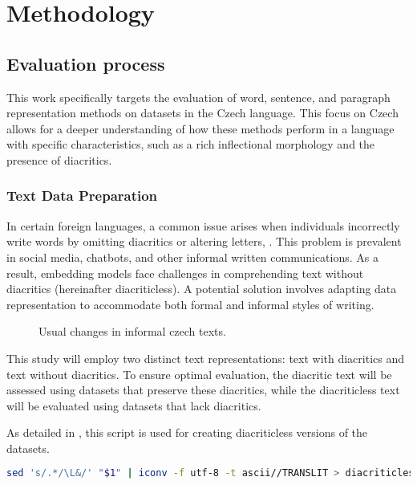 
\chapter{Methodology\label{chap:methodology}}

\section{Evaluation process}

This work specifically targets the evaluation of word, sentence, and paragraph representation methods on datasets in the Czech language.
This focus on Czech allows for a deeper understanding of how these methods perform in a language with specific characteristics, such as a rich inflectional morphology and the presence of diacritics.

\subsection{Text Data Preparation}
In certain foreign languages, a common issue arises when individuals incorrectly write words by omitting diacritics or altering letters, .
This problem is prevalent in social media, chatbots, and other informal written communications.
As a result, embedding models face challenges in comprehending text without diacritics (hereinafter diacriticless).
A potential solution involves adapting data representation to accommodate both formal and informal styles of writing.

\begin{figure}[h]
  \centering
  
  \caption{Usual changes in informal czech texts.}
  \label{fig:diacritics_diacriticless}
\end{figure} 

This study will employ two distinct text representations: text with diacritics and text without diacritics.
To ensure optimal evaluation, the diacritic text will be assessed using datasets that preserve these diacritics, while the diacriticless text will be evaluated using datasets that lack diacritics.

As detailed in , this script is used for creating diacriticless versions of the datasets.

\begin{lstlisting}[language=bash,basicstyle=\small\ttfamily, frame=single, caption={Script for removing diacritics using Unix utilities}, captionpos=b, label={lst:diacriticless.sh},backgroundcolor=\color{light-gray}] 
  sed 's/.*/\L&/' "$1" | iconv -f utf-8 -t ascii//TRANSLIT > diacriticless/"$1"
\end{lstlisting}


